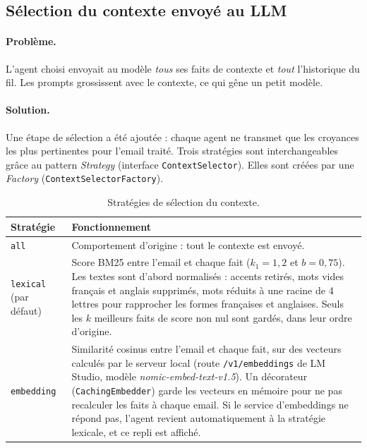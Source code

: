 \documentclass[11pt,a4paper]{article}
\newcommand{\code}[1]{\texttt{#1}}
\begin{document}
\subsection{Sélection du contexte envoyé au LLM}
\label{sec:contexte}

\paragraph{Problème.} L'agent choisi envoyait au modèle \emph{tous} ses faits de contexte
et \emph{tout} l'historique du fil. Les prompts grossissent avec le contexte, ce qui gêne
un petit modèle.

\paragraph{Solution.} Une étape de sélection a été ajoutée : chaque agent ne transmet que
les croyances les plus pertinentes pour l'email traité. Trois stratégies sont
interchangeables grâce au pattern \emph{Strategy} (interface \code{ContextSelector}).
Elles sont créées par une \emph{Factory} (\code{ContextSelectorFactory}).

\begin{table}[H]
\centering
\small
\begin{tabularx}{\linewidth}{l L}
\toprule
\textbf{Stratégie} & \textbf{Fonctionnement} \\
\midrule
\code{all} & Comportement d'origine : tout le contexte est envoyé. \\
\addlinespace
\code{lexical} (par défaut) & Score BM25 entre l'email et chaque fait ($k_1 = 1{,}2$ et
$b = 0{,}75$). Les textes sont d'abord normalisés : accents retirés, mots vides français
et anglais supprimés, mots réduits à une racine de 4 lettres pour rapprocher les formes
françaises et anglaises. Seuls les $k$ meilleurs faits de score non nul sont gardés,
dans leur ordre d'origine. \\
\addlinespace
\code{embedding} & Similarité cosinus entre l'email et chaque fait, sur des vecteurs
calculés par le serveur local (route \code{/v1/embeddings} de LM Studio, modèle
\emph{nomic-embed-text-v1.5}). Un décorateur (\code{CachingEmbedder}) garde les vecteurs
en mémoire pour ne pas recalculer les faits à chaque email. Si le service d'embeddings ne
répond pas, l'agent revient automatiquement à la stratégie lexicale, et ce repli est
affiché. \\
\bottomrule
\end{tabularx}
\caption{Stratégies de sélection du contexte.}
\end{table}
\end{document}
